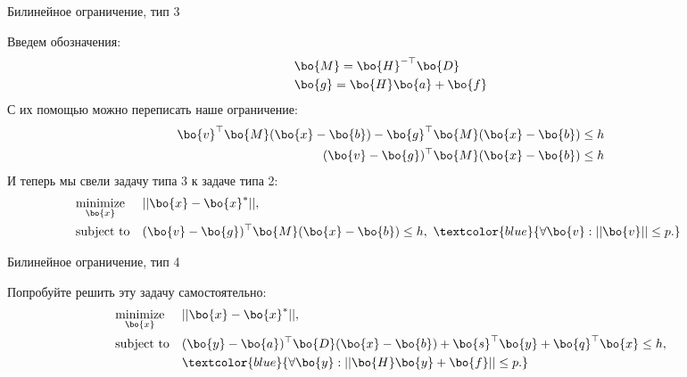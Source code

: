 \documentclass{beamer}
\begin{document}
\begin{frame}{Билинейное ограничение, тип 3}
	\begin{flushleft}
		
		Введем обозначения:
		\begin{align}
			& \bo{M} = \bo{H}^{-\top} \bo{D} \\
			& \bo{g} = \bo{H}\bo{a} + \bo{f}
		\end{align}
		С их помощью можно переписать наше ограничение:
		\begin{align}
			\bo{v}^\top \bo{M} (\bo{x} - \bo{b}) - \bo{g}^\top \bo{M} (\bo{x} - \bo{b}) \leq h \\
			(\bo{v} - \bo{g})^\top \bo{M} (\bo{x} - \bo{b}) \leq h 
		\end{align}
		И теперь мы свели задачу типа 3 к задаче типа 2:
		\begin{equation}
			\begin{aligned}
				& \underset{\bo{x}}{\text{minimize}} 
				& & ||\bo{x} - \bo{x}^*||, \\
				& \text{subject to}
				& & (\bo{v} - \bo{g})^\top \bo{M} (\bo{x} - \bo{b}) \leq h, \ 
				\textcolor{blue}{
					\forall \bo{v} : ||\bo{v}|| \leq p.} 
				& & & 
			\end{aligned}
		\end{equation}
		
		
	\end{flushleft}
\end{frame}

\begin{frame}{Билинейное ограничение, тип 4}
	\begin{flushleft}
		
		Попробуйте решить эту задачу самостоятельно:
		\begin{equation}
			\begin{aligned}
				& \underset{\bo{x}}{\text{minimize}} 
				& & ||\bo{x} - \bo{x}^*||, \\
				& \text{subject to}
				& & (\bo{y} - \bo{a})^\top \bo{D} (\bo{x} - \bo{b})  + 
				\bo{s}^\top \bo{y} + \bo{q}^\top \bo{x} \leq h, \\
				& & &	\textcolor{blue}{
					\forall \bo{y} :  ||\bo{H}\bo{y} + \bo{f}|| \leq p.} 
			\end{aligned}
		\end{equation}
		
	\end{flushleft}
\end{frame}
\end{document}
